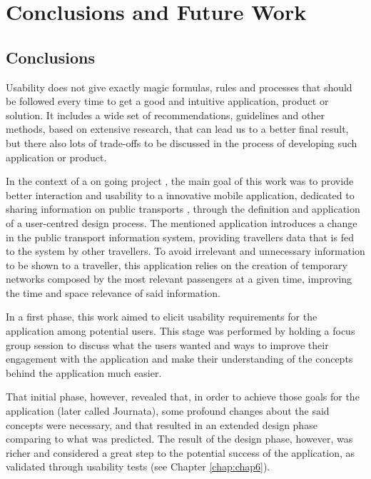 \chapter{Conclusions and Future Work} \label{chap:chap7}

\section{Conclusions}

Usability does not give exactly magic formulas, rules and processes that should be followed every time to get a good and intuitive application, product or solution.
It includes a wide set of recommendations, guidelines and other methods, based on extensive research, that can lead us to a better final result, but there also lots of trade-offs to be discussed in the process of developing such application or product.

In the context of a on going project \cite{kn:Nun12}\cite{kn:NGCP11}, the main goal of this work was to provide better interaction and usability to a innovative mobile application, dedicated to sharing information on public transports \cite{kn:Gon12}, through the definition and application of a user-centred design process. The mentioned application introduces a change in the public transport information system, providing travellers data that is fed to the system by other travellers. To avoid irrelevant and unnecessary information to be shown to a traveller, this application relies on the creation of temporary networks composed by the most relevant passengers at a given time, improving the time and space relevance of said information.

In a first phase, this work aimed to elicit usability requirements for the application among potential users. This stage was performed by holding a focus group session to discuss what the users wanted and ways to improve their engagement with the application and make their understanding of the concepts behind the application much easier.

That initial phase, however, revealed that, in order to achieve those goals for the application (later called Journata), some profound changes about the said concepts were necessary, and that resulted in an extended design phase comparing to what was predicted. 
The result of the design phase, however, was richer and considered a great step to the potential success of the application, as validated through usability tests (see Chapter \ref{chap:chap6}).

